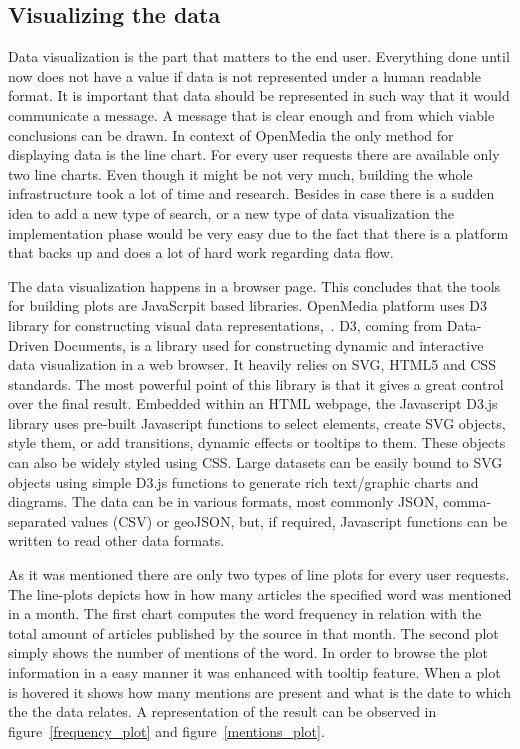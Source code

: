 \subsection{Visualizing the data}
Data visualization is the part that matters to the end user. Everything done until now does not have a value if data is not represented under a human readable format. It is important that data should be represented in such way that it would communicate a message. A message that is clear enough and from which viable conclusions can be drawn. In context of OpenMedia the only method for displaying data is the line chart. For every user requests there are available only two line charts. Even though it might be not very much, building the whole infrastructure took a lot of time and research. Besides in case there is a sudden idea to add a new type of search, or a new type of data visualization the implementation phase would be very easy due to the fact that there is a platform that backs up and does a lot of hard work regarding data flow.

The data visualization happens in a browser page. This concludes that the tools for building plots are JavaScrpit based libraries. OpenMedia platform uses D3 library for constructing visual data \mbox{representations, \cite{d3}}. D3, coming from Data-Driven Documents, is a library used for constructing dynamic and interactive data visualization in a web browser. It heavily relies on SVG, HTML5 and CSS standards. The most powerful point of this library is that it gives a great control over the final result. Embedded within an HTML webpage, the Javascript D3.js library uses pre-built Javascript functions to select elements, create SVG objects, style them, or add transitions, dynamic effects or tooltips to them. These objects can also be widely styled using CSS. Large datasets can be easily bound to SVG objects using simple D3.js functions to generate rich text/graphic charts and diagrams. The data can be in various formats, most commonly JSON, comma-separated values (CSV) or geoJSON, but, if required, Javascript functions can be written to read other data formats.

As it was mentioned there are only two types of line plots for every user requests. The line-plots depicts how in how many articles the specified word was mentioned in a month. The first chart computes the word frequency in relation with the total amount of articles published by the source in that month. The second plot simply shows the number of mentions of the word. In order to browse the plot information in a easy manner it was enhanced with tooltip feature. When a plot is hovered it shows how many mentions are present and what is the date to which the the data relates. A representation of the result can be observed in \mbox{figure \ref{frequency_plot}} and \mbox{figure \ref{mentions_plot}}.

